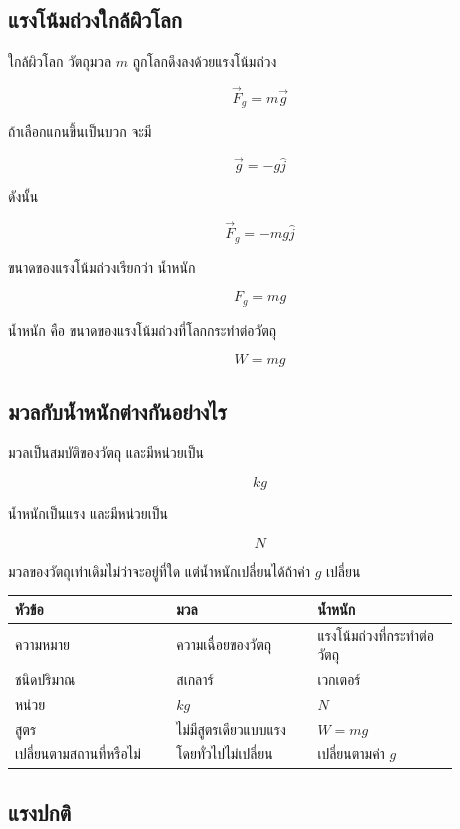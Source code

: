 \subsection{แรงโน้มถ่วงใกล้ผิวโลก}

ใกล้ผิวโลก วัตถุมวล $m$ ถูกโลกดึงลงด้วยแรงโน้มถ่วง

\[
\vec{F}_g=m\vec{g}
\]

ถ้าเลือกแกนขึ้นเป็นบวก จะมี

\[
\vec{g}=-g\hat{j}
\]

ดังนั้น

\[
\vec{F}_g=-mg\hat{j}
\]

ขนาดของแรงโน้มถ่วงเรียกว่า น้ำหนัก

\[
F_g=mg
\]

\begin{tcolorbox}[title=นิยาม]
น้ำหนัก คือ ขนาดของแรงโน้มถ่วงที่โลกกระทำต่อวัตถุ

\[
W=mg
\]
\end{tcolorbox}

\subsection{มวลกับน้ำหนักต่างกันอย่างไร}

มวลเป็นสมบัติของวัตถุ และมีหน่วยเป็น

\[
\si{kg}
\]

น้ำหนักเป็นแรง และมีหน่วยเป็น

\[
\si{N}
\]

มวลของวัตถุเท่าเดิมไม่ว่าจะอยู่ที่ใด แต่น้ำหนักเปลี่ยนได้ถ้าค่า $g$ เปลี่ยน

\begin{center}
\begin{tabular}{|p{0.32\linewidth}|p{0.28\linewidth}|p{0.28\linewidth}|}
\hline
\textbf{หัวข้อ} & \textbf{มวล} & \textbf{น้ำหนัก} \\
\hline
ความหมาย & ความเฉื่อยของวัตถุ & แรงโน้มถ่วงที่กระทำต่อวัตถุ \\
\hline
ชนิดปริมาณ & สเกลาร์ & เวกเตอร์ \\
\hline
หน่วย & $\si{kg}$ & $\si{N}$ \\
\hline
สูตร & ไม่มีสูตรเดียวแบบแรง & $W=mg$ \\
\hline
เปลี่ยนตามสถานที่หรือไม่ & โดยทั่วไปไม่เปลี่ยน & เปลี่ยนตามค่า $g$ \\
\hline
\end{tabular}
\end{center}

\subsection{แรงปกติ}

